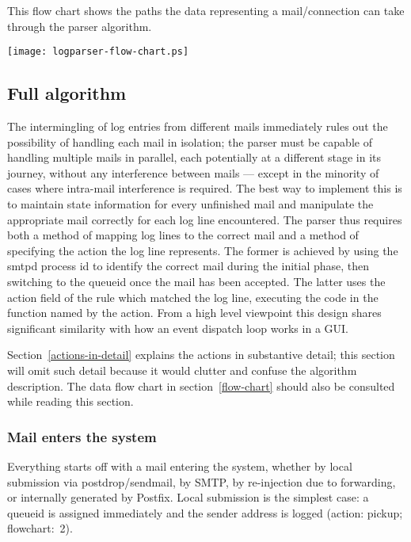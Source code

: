 \documentclass[a4paper,12pt,draft]{article}
\begin{document}
\label{flow-chart}

This flow chart shows the paths the data representing a mail/connection can
take through the parser algorithm.

\texttt{[image: logparser-flow-chart.ps]}

\subsection{Full algorithm}

\label{full-algorithm}

The intermingling of log entries from different mails immediately rules out
the possibility of handling each mail in isolation; the parser must be
capable of handling multiple mails in parallel, each potentially at a
different stage in its journey, without any interference between mails ---
except in the minority of cases where intra-mail interference is required.
The best way to implement this is to maintain state information for every
unfinished mail and manipulate the appropriate mail correctly for each log
line encountered.  The parser thus requires both a method of mapping log
lines to the correct mail and a method of specifying the action the log
line represents.  The former is achieved by using the smtpd process id to
identify the correct mail during the initial phase, then switching to the
queueid once the mail has been accepted.  The latter uses the action field
of the rule which matched the log line, executing the code in the function
named by the action.  From a high level viewpoint this design shares
significant similarity with how an event dispatch loop works in a GUI\@.

Section~\ref{actions-in-detail} explains the actions in substantive detail;
this section will omit such detail because it would clutter and confuse the
algorithm description.  The data flow chart in section~\ref{flow-chart}
should also be consulted while reading this section.

\subsubsection{Mail enters the system}

\label{mail-enters-the-system}

Everything starts off with a mail entering the system, whether by local
submission via postdrop/sendmail, by SMTP, by re-injection due to
forwarding, or internally generated by Postfix.  Local submission is the
simplest case: a queueid is assigned immediately and the sender address is
logged (action: pickup; flowchart:~2).
\end{document}
